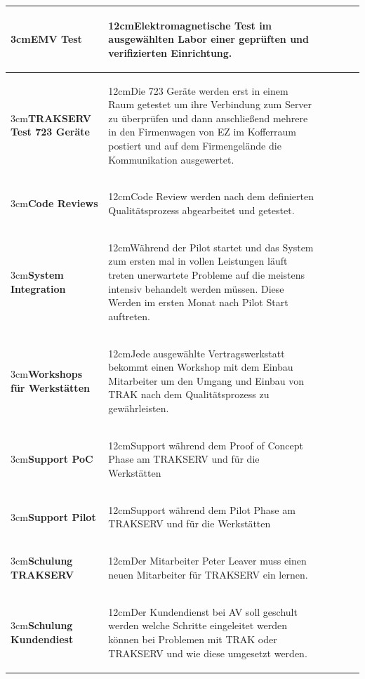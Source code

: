 \documentclass[a4paper,10pt]{scrartcl}
\newcommand\Umbruch[2][3cm]{\begin{varwidth}{#1}\centering#2\end{varwidth}}
\newcommand\Absatz[2][12cm]{\begin{varwidth}{#1}\flushleft#2\end{varwidth}}
\begin{document}
\begin{adjustbox}{width=\textwidth}
\begin{tabular}{llrrrr}
\midrule
{\Umbruch{\textbf{EMV Test}}}  & {\Absatz{Elektromagnetische Test im ausgewählten Labor einer geprüften und verifizierten Einrichtung.
\linebreak}} \\
\midrule
{\Umbruch{\textbf{TRAKSERV Test 723 Geräte}}}  & {\Absatz{Die 723 Geräte werden erst in einem Raum getestet um ihre Verbindung zum Server zu überprüfen und dann anschließend mehrere in den Firmenwagen von EZ im Kofferraum postiert und auf dem Firmengelände die Kommunikation ausgewertet.
\linebreak}} \\
\midrule
{\Umbruch{\textbf{Code Reviews}}}  & {\Absatz{Code Review werden nach dem definierten Qualitätsprozess abgearbeitet und getestet.
\linebreak}} \\
\midrule
{\Umbruch{\textbf{System Integration}}}  & {\Absatz{Während der Pilot startet und das System zum ersten mal in vollen Leistungen läuft treten unerwartete Probleme auf die meistens intensiv behandelt werden müssen. Diese Werden im ersten Monat nach Pilot Start auftreten.
\linebreak}} \\
\midrule
{\Umbruch{\textbf{Workshops für Werkstätten}}}  & {\Absatz{Jede ausgewählte Vertragswerkstatt bekommt einen Workshop mit dem Einbau Mitarbeiter um den Umgang und Einbau von TRAK nach dem Qualitätsprozess zu gewährleisten.
\linebreak}} \\
\midrule
{\Umbruch{\textbf{Support PoC}}}  & {\Absatz{Support während dem Proof of Concept Phase am TRAKSERV und für die Werkstätten
\linebreak}} \\
\midrule
{\Umbruch{\textbf{Support Pilot}}}  & {\Absatz{Support während dem Pilot Phase am TRAKSERV und für die Werkstätten
\linebreak}} \\
\midrule
{\Umbruch{\textbf{Schulung TRAKSERV}}}  & {\Absatz{Der Mitarbeiter Peter Leaver muss einen neuen Mitarbeiter für TRAKSERV ein lernen.
\linebreak}} \\
\midrule
{\Umbruch{\textbf{Schulung Kundendiest}}}  & {\Absatz{Der Kundendienst bei AV soll geschult werden welche Schritte eingeleitet werden können bei Problemen mit TRAK oder TRAKSERV und wie diese umgesetzt werden.  
\linebreak}} \\

\end{tabular}
\end{adjustbox}
\end{document}
